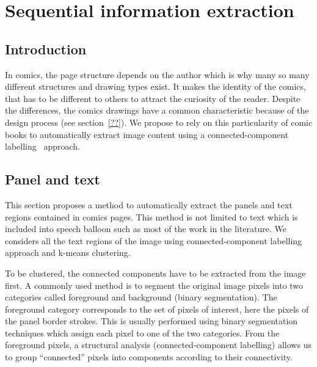 \chapter{Sequential information extraction}%
\label{chap:sequential}
\graphicspath{{./chapters/3-sequential/figs/}}



\section{Introduction} %
\label{sec:introduction}

In comics, the page structure depends on the author which is why many so many different structures and drawing types exist.
It makes the identity of the comics, that has to be different to others to attract the curiosity of the reader.
Despite the differences, the comics drawings have a common characteristic because of the design process (see section~\ref{??}).
We propose to rely on this particularity of comic books to automatically extract image content using a connected-component labelling~\cite{Szeliski2010Computer} approach.


\section{Panel and text} %
\label{sec:se:panel_and_text}


This section proposes a method to automatically extract the panels and text regions contained in comics pages.
This method is not limited to text which is included into speech balloon such as most of the work in the literature.
We considers all the text regions of the image using connected-component labelling approach and k-means clustering.


To be clustered, the connected components have to be extracted from the image first.
A commonly used method is to segment the original image pixels into two categories called foreground and background (binary segmentation).
The foreground category corresponds to the set of pixels of interest, here the pixels of the panel border strokes.
This is usually performed using binary segmentation techniques which assign each pixel to one of the two categories.
From the foreground pixels, a structural analysis (connected-component labelling) allows us to group ``connected'' pixels into components according to their connectivity.

